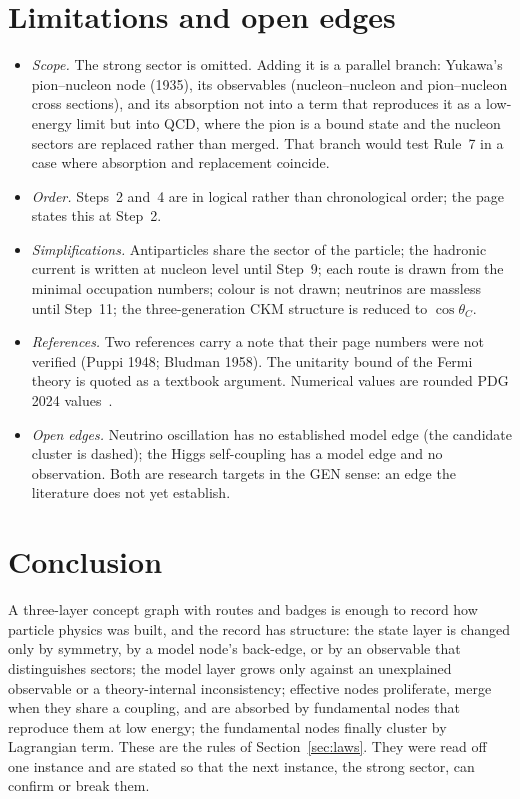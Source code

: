 \documentclass[11pt,a4paper]{article}
\begin{document}
\section{Limitations and open edges}\label{sec:limits}
\begin{itemize}
\item \emph{Scope.} The strong sector is omitted. Adding it is a parallel branch: Yukawa's pion--nucleon node (1935), its observables (nucleon--nucleon and pion--nucleon cross sections), and its absorption not into a term that reproduces it as a low-energy limit but into QCD, where the pion is a bound state and the nucleon sectors are replaced rather than merged. That branch would test Rule~7 in a case where absorption and replacement coincide.
\item \emph{Order.} Steps~2 and~4 are in logical rather than chronological order; the page states this at Step~2.
\item \emph{Simplifications.} Antiparticles share the sector of the particle; the hadronic current is written at nucleon level until Step~9; each route is drawn from the minimal occupation numbers; colour is not drawn; neutrinos are massless until Step~11; the three-generation CKM structure is reduced to $\cos\theta_C$.
\item \emph{References.} Two references carry a note that their page numbers were not verified (Puppi 1948; Bludman 1958). The unitarity bound of the Fermi theory is quoted as a textbook argument. Numerical values are rounded PDG 2024 values~\cite{PDG2024}.
\item \emph{Open edges.} Neutrino oscillation has no established model edge (the candidate cluster is dashed); the Higgs self-coupling has a model edge and no observation. Both are research targets in the GEN sense: an edge the literature does not yet establish.
\end{itemize}

\section{Conclusion}
A three-layer concept graph with routes and badges is enough to record how particle physics was built, and the record has structure: the state layer is changed only by symmetry, by a model node's back-edge, or by an observable that distinguishes sectors; the model layer grows only against an unexplained observable or a theory-internal inconsistency; effective nodes proliferate, merge when they share a coupling, and are absorbed by fundamental nodes that reproduce them at low energy; the fundamental nodes finally cluster by Lagrangian term. These are the rules of Section~\ref{sec:laws}. They were read off one instance and are stated so that the next instance, the strong sector, can confirm or break them.
\end{document}
